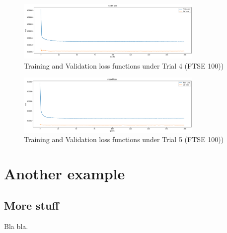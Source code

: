 \documentclass[a4paper,11pt,oneside]{book}
\begin{document}
\begin{appendix}
\begin{figure}[!h]
	\centering
	\includegraphics[width=0.8\textwidth]{figures/FTSE4}
	\caption{Training and Validation loss functions under Trial 4 (FTSE 100))}
	\label{FTSE4}
\end{figure}

\begin{figure}[!h]
	\centering
	\includegraphics[width=0.8\textwidth]{figures/FTSE5}
	\caption{Training and Validation loss functions under Trial 5 (FTSE 100))}
	\label{FTSE5}
\end{figure}
	
	
	\chapter{Another example}
	\label{app_ex2}
	
	
	\section{More stuff}
	
	Bla bla.
	
\end{appendix}


%



\listoffigures
\listoftables

\printindex

\end{document}
